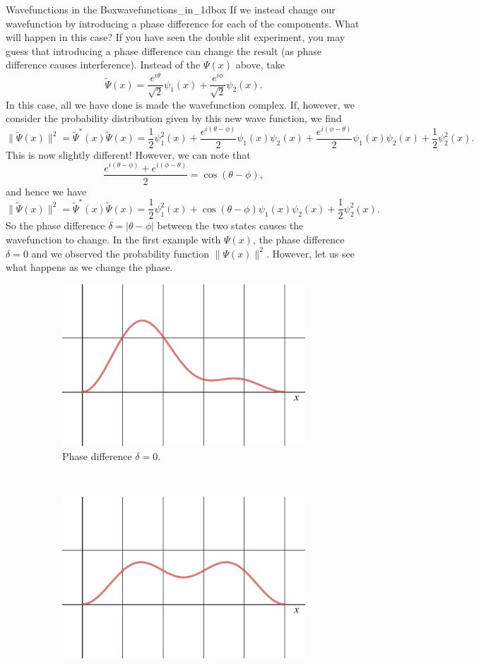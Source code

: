 \begin{ex}{Wavefunctions in the Box}{wavefunctions_in_1dbox}
	If we instead change our wavefunction by introducing a phase difference for each of the components.  What will happen in this case? If you have seen the double slit experiment, you may guess that introducing a phase difference can change the result (as phase difference causes interference). Instead of the $\Psi(x)$ above, take 
	\[
		\tilde{\Psi}(x) = \frac{e^{i\theta}}{\sqrt{2}} \psi_1(x) + \frac{e^{i\phi}}{\sqrt{2}} \psi_2(x).
	\]
	In this case, all we have done is made the wavefunction complex.  If, however, we consider the probability distribution given by this new wave function, we find
	\[
		\|\tilde{\Psi}(x)\|^2 = \tilde{\Psi}^*(x)\tilde{\Psi}(x) = \frac{1}{2}\psi_1^2(x)+\frac{e^{i(\theta-\phi)}}{2}\psi_1(x)\psi_2(x)+\frac{e^{i(\phi-\theta)}}{2}\psi_1(x)\psi_2(x)+\frac{1}{2}\psi_2^2(x).
	\]
	This is now slightly different! However, we can note that
	\[
		\frac{e^{i(\theta-\phi)}+e^{i(\phi-\theta)}}{2} = \cos(\theta-\phi),
	\]
	and hence we have
	\[
		\|\tilde{\Psi}(x)\|^2 = \tilde{\Psi}^*(x)\tilde{\Psi}(x) = \frac{1}{2}\psi_1^2(x)+\cos(\theta-\phi)\psi_1(x)\psi_2(x)+\frac{1}{2}\psi_2^2(x).
	\]
	So the phase difference $\delta=|\theta-\phi|$ between the two states causes the wavefunction to change. In the first example with $\Psi(x)$, the phase difference $\delta=0$ and we observed the probability function $\|\Psi(x)\|^2$.  However, let us see what happens as we change the phase.
	\begin{figure}[H]
	\centering
		\begin{subfigure}[h]{0.49\textwidth}
			\centering
			\includegraphics[width=.8\textwidth]{Figures_Part_5/prob_Psi_pi4.png}
			\caption{Phase difference $\delta=0$.}
		\end{subfigure}
		~
		\begin{subfigure}[h]{0.49\textwidth}
			\centering
			\includegraphics[width=.8\textwidth]{Figures_Part_5/prob_Psi_pi2.png}

\end{subfigure}
\end{figure}
\end{ex}

